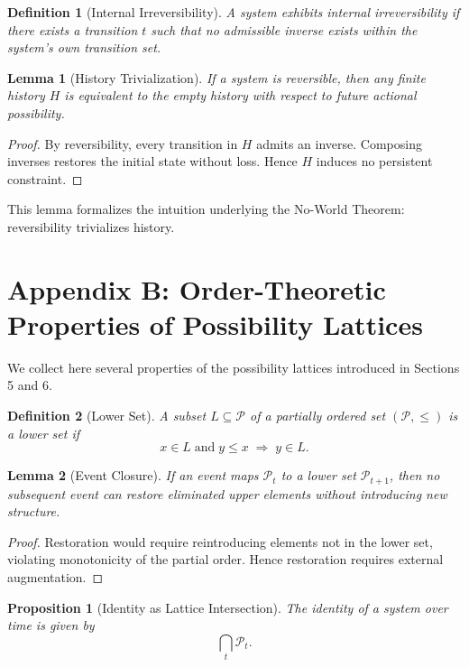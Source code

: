 \documentclass[11pt]{article}
\newtheorem{definition}{Definition}
\newtheorem{lemma}{Lemma}
\newtheorem{proposition}{Proposition}
\theoremstyle{remark}
\begin{document}
\begin{definition}[Internal Irreversibility]
A system exhibits internal irreversibility if there exists a transition $t$ such that no admissible inverse exists within the system’s own transition set.
\end{definition}

\begin{lemma}[History Trivialization]
If a system is reversible, then any finite history $H$ is equivalent to the empty history with respect to future actional possibility.
\end{lemma}

\begin{proof}
By reversibility, every transition in $H$ admits an inverse. Composing inverses restores the initial state without loss. Hence $H$ induces no persistent constraint.
\end{proof}

This lemma formalizes the intuition underlying the No-World Theorem: reversibility trivializes history.

\section{Appendix B: Order-Theoretic Properties of Possibility Lattices}

We collect here several properties of the possibility lattices introduced in Sections 5 and 6.

\begin{definition}[Lower Set]
A subset $L \subseteq \mathcal{P}$ of a partially ordered set $(\mathcal{P}, \leq)$ is a lower set if
\[
x \in L \;\text{and}\; y \leq x \;\Rightarrow\; y \in L.
\]
\end{definition}

\begin{lemma}[Event Closure]
If an event maps $\mathcal{P}_t$ to a lower set $\mathcal{P}_{t+1}$, then no subsequent event can restore eliminated upper elements without introducing new structure.
\end{lemma}

\begin{proof}
Restoration would require reintroducing elements not in the lower set, violating monotonicity of the partial order. Hence restoration requires external augmentation.
\end{proof}

\begin{proposition}[Identity as Lattice Intersection]
The identity of a system over time is given by
\[
\bigcap_{t} \mathcal{P}_t.
\]
\end{proposition}
\end{document}
